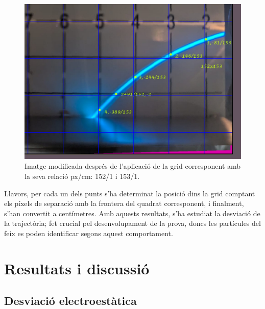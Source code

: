 \documentclass[11pt]{article}
\begin{document}
\begin{figure}[H]
    \centering
    \includegraphics[scale=0.3]{Ex_grid.png}
    \caption{Imatge modificada després de l'aplicació de la grid corresponent amb la seva relació px/cm: 152/1 i 153/1.}
    \label{fig: ex_grid}
\end{figure}


Llavors, per cada un dels punts s'ha determinat la posició dins la grid comptant els píxels de separació amb la frontera del quadrat corresponent, i finalment, s'han convertit a centímetres. Amb aquests resultats, s'ha estudiat la desviació de la trajectòria; fet crucial pel desenvolupament de la prova, doncs les partícules del feix es poden identificar segons aquest comportament.

\newpage
\section{Resultats i discussió}

\subsection{Desviació electroestàtica}\label{sec: desv_electr}
\end{document}
